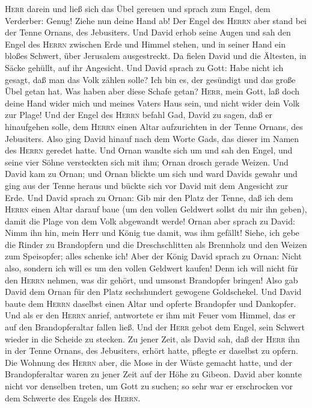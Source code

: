 \textsc{Herr} darein und ließ sich das Übel gereuen und sprach zum
Engel, dem Verderber: Genug! Ziehe nun deine Hand ab! Der Engel des
\textsc{Herrn} aber stand bei der Tenne Ornans, des Jebusiters.
 Und David erhob seine Augen und sah den Engel des
\textsc{Herrn} zwischen Erde und Himmel stehen, und in seiner Hand ein
bloßes Schwert, über Jerusalem ausgestreckt. Da fielen David und die
Ältesten, in Säcke gehüllt, auf ihr Angesicht.  Und David
sprach zu Gott: Habe nicht ich gesagt, daß man das Volk zählen solle?
Ich bin es, der gesündigt und das große Übel getan hat. Was haben aber
diese Schafe getan? \textsc{Herr}, mein Gott, laß doch deine Hand wider
mich und meines Vaters Haus sein, und nicht wider dein Volk zur Plage!
 Und der Engel des \textsc{Herrn} befahl Gad, David zu
sagen, daß er hinaufgehen solle, dem \textsc{Herrn} einen Altar
aufzurichten in der Tenne Ornans, des Jebusiters.  Also
ging David hinauf nach dem Worte Gads, das dieser im Namen des
\textsc{Herrn} geredet hatte.  Und Ornan wandte sich um
und sah den Engel, und seine vier Söhne versteckten sich mit ihm; Ornan
drosch gerade Weizen.  Und David kam zu Ornan; und Ornan
blickte um sich und ward Davids gewahr und ging aus der Tenne heraus und
bückte sich vor David mit dem Angesicht zur Erde.  Und
David sprach zu Ornan: Gib mir den Platz der Tenne, daß ich dem
\textsc{Herrn} einen Altar darauf baue (um den vollen Geldwert sollst du
mir ihn geben), damit die Plage von dem Volk abgewandt werde!
 Ornan aber sprach zu David: Nimm ihn hin, mein Herr und
König tue damit, was ihm gefällt! Siehe, ich gebe die Rinder zu
Brandopfern und die Dreschschlitten als Brennholz und den Weizen zum
Speisopfer; alles schenke ich!  Aber der König David
sprach zu Ornan: Nicht also, sondern ich will es um den vollen Geldwert
kaufen! Denn ich will nicht für den \textsc{Herrn} nehmen, was dir
gehört, und umsonst Brandopfer bringen!  Also gab David
dem Ornan für den Platz sechshundert gewogene Goldschekel.
 Und David baute dem \textsc{Herrn} daselbst einen Altar
und opferte Brandopfer und Dankopfer. Und als er den \textsc{Herrn}
anrief, antwortete er ihm mit Feuer vom Himmel, das er auf den
Brandopferaltar fallen ließ.  Und der \textsc{Herr} gebot
dem Engel, sein Schwert wieder in die Scheide zu stecken.
 Zu jener Zeit, als David sah, daß der \textsc{Herr} ihn
in der Tenne Ornans, des Jebusiters, erhört hatte, pflegte er daselbst
zu opfern.  Die Wohnung des \textsc{Herrn} aber, die Mose
in der Wüste gemacht hatte, und der Brandopferaltar waren zu jener Zeit
auf der Höhe zu Gibeon.  David aber konnte nicht vor
denselben treten, um Gott zu suchen; so sehr war er erschrocken vor dem
Schwerte des Engels des \textsc{Herrn}.

